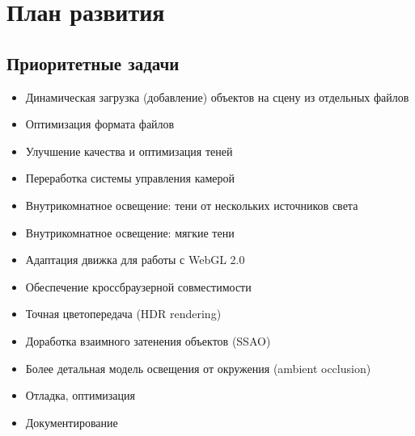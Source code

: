 \documentclass[a4paper,12pt,oneside]{sphinxmanual}
\begin{document}
\chapter{План развития}
\label{roadmap:id1}\label{roadmap::doc}\label{roadmap:roadmap}

\section{Приоритетные задачи}
\label{roadmap:id2}\begin{itemize}
\item {} 
Динамическая загрузка (добавление) объектов на сцену из отдельных файлов

\item {} 
Оптимизация формата файлов

\item {} 
Улучшение качества и оптимизация теней

\item {} 
Переработка системы управления камерой

\item {} 
Внутрикомнатное освещение: тени от нескольких источников света

\item {} 
Внутрикомнатное освещение: мягкие тени

\item {} 
Адаптация движка для работы с WebGL 2.0

\item {} 
Обеспечение кроссбраузерной совместимости

\item {} 
Точная цветопередача (HDR rendering)

\item {} 
Доработка взаимного затенения объектов (SSAO)

\item {} 
Более детальная модель освещения от окружения (ambient occlusion)

\item {} 
Отладка, оптимизация

\item {} 
Документирование

\end{itemize}
\end{document}
